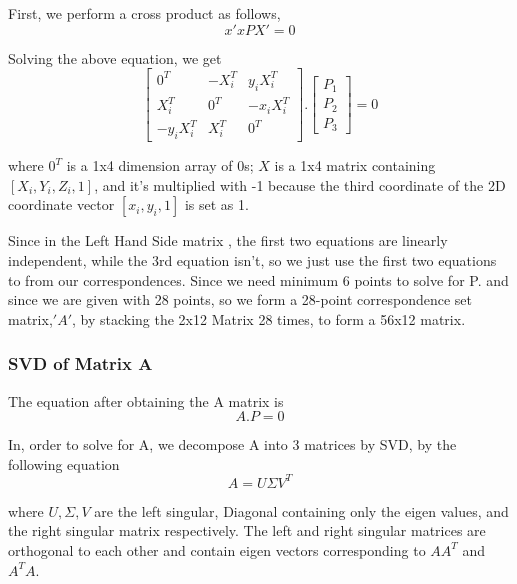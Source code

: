\documentclass{article}[11pt]
\begin{document}
First, we perform a cross product as follows,
\begin{equation}
x' x PX' = 0
\end{equation}

Solving the above equation, we get
\begin{equation}
\left[ {\begin{array}{cccc}
   0^T & -X_{i}^T & y_{i} X_{i}^T\\
X_{i}^T & 0^T & -x_{i}X_{i}^T\\
-y_{i}X_{i}^T & X_{i}^T & 0^T
  \end{array} } \right] .          
  \left[ {\begin{array}{cccc}
   P_1\\
P_2\\
P_3
  \end{array} } \right] = 0        
\end{equation}

where $0^T$ is a 1x4 dimension array of 0s; $X$ is a 1x4 matrix containing $[X_i,Y_i,Z_i,1]$, and it's multiplied with -1 because the third coordinate of the 2D coordinate vector $[x_i,y_i,1]$ is set as 1.

Since in the Left Hand Side matrix , the first two equations are linearly independent, while the 3rd equation isn't, so we just use the first two equations to from our correspondences.
Since we need minimum 6 points to solve for P. and since we are given with 28 points, so we form a 28-point correspondence set matrix,$'A'$, by stacking the 2x12 Matrix 28 times, to form a 56x12 matrix. 

\subsubsection{SVD of Matrix A}

The equation after obtaining the A matrix is
\begin{equation}
    A.P = 0
\end{equation}

In, order to solve for A, we decompose A into 3 matrices by SVD, by the following equation
\begin{equation}
    A = U \Sigma V^T
\end{equation}

where $U, \Sigma , V$ are the left singular, Diagonal containing only the eigen values, and the right singular matrix respectively. The left and right singular matrices are orthogonal to each other and contain eigen vectors corresponding to $AA^T$ and $A^TA$.
\end{document}
